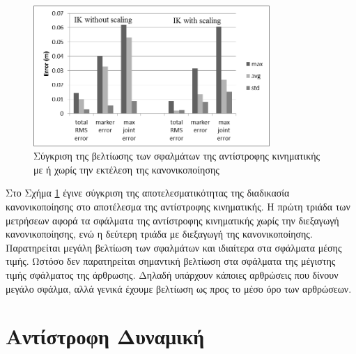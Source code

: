 \begin{figure}[H]
    \centering
    \includegraphics[width=0.8\textwidth, keepaspectratio]{fig/ik-no-scale-with-scale.png}
    \caption{Σύγκριση της βελτίωσης των σφαλμάτων της αντίστροφης κινηματικής με ή χωρίς την εκτέλεση της κανονικοποίησης}
    \label{fig:ik-no-scale-with-scale}
\end{figure}

Στο Σχήμα \ref{fig:ik-no-scale-with-scale} έγινε σύγκριση της αποτελεσματικότητας της διαδικασία κανονικοποίησης στο αποτέλεσμα της αντίστροφης κινηματικής. Η πρώτη τριάδα των μετρήσεων αφορά τα σφάλματα της αντίστροφης κινηματικής χωρίς την διεξαγωγή κανονικοποίησης, ενώ η δεύτερη τριάδα με διεξαγωγή της κανονικοποίησης. Παρατηρείται μεγάλη βελτίωση των σφαλμάτων και ιδιαίτερα στα σφάλματα μέσης τιμής. Ωστόσο δεν παρατηρείται σημαντική βελτίωση στα σφάλματα της μέγιστης τιμής σφάλματος της άρθρωσης. Δηλαδή υπάρχουν κάποιες αρθρώσεις που δίνουν μεγάλο σφάλμα, αλλά γενικά έχουμε βελτίωση ως προς το μέσο όρο των αρθρώσεων.

\section{Αντίστροφη Δυναμική}

